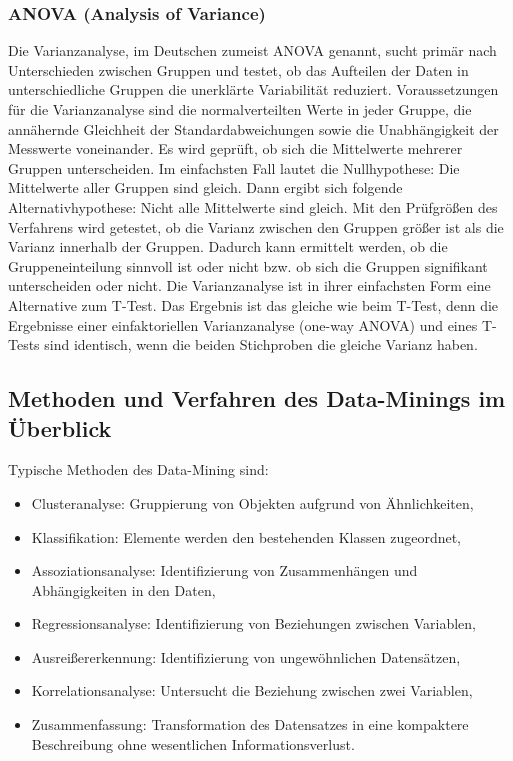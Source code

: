 \subsubsection{ANOVA (Analysis of Variance)}

\glqq Die Varianzanalyse, im Deutschen zumeist ANOVA genannt, sucht primär nach Unterschieden zwischen Gruppen und testet, ob das Aufteilen der Daten in unterschiedliche Gruppen die unerklärte Variabilität reduziert.\grqq \cite{Dormann:2013} Voraussetzungen für die Varianzanalyse sind die normalverteilten Werte in jeder Gruppe, die annähernde Gleichheit der Standardabweichungen sowie die Unabhängigkeit der Messwerte voneinander. Es wird geprüft, ob sich die Mittelwerte mehrerer Gruppen unterscheiden. Im einfachsten Fall lautet die Nullhypothese: Die Mittelwerte aller Gruppen sind gleich. Dann ergibt sich folgende Alternativhypothese: Nicht alle Mittelwerte sind gleich. Mit den Prüfgrößen des Verfahrens wird getestet, ob die Varianz zwischen den Gruppen größer ist als die Varianz innerhalb der Gruppen. Dadurch kann ermittelt werden, ob die Gruppeneinteilung sinnvoll ist oder nicht bzw. ob sich die Gruppen signifikant unterscheiden oder nicht. Die Varianzanalyse ist in ihrer einfachsten Form eine Alternative zum T-Test. Das Ergebnis ist das gleiche wie beim T-Test, \glqq denn die Ergebnisse einer einfaktoriellen Varianzanalyse (one-way ANOVA) und eines T-Tests sind identisch, wenn die beiden Stichproben die gleiche Varianz haben.\grqq \cite{Dormann:2013}

\subsection{Methoden und Verfahren des Data-Minings im Überblick}


Typische Methoden des Data-Mining sind:

\begin{itemize}
  \item Clusteranalyse: Gruppierung von Objekten aufgrund von Ähnlichkeiten,
  \item Klassifikation: Elemente werden den bestehenden Klassen zugeordnet,
  \item Assoziationsanalyse: Identifizierung von Zusammenhängen und Abhängigkeiten in den Daten,
  \item Regressionsanalyse: Identifizierung von Beziehungen zwischen Variablen,
  \item Ausreißererkennung: Identifizierung von ungewöhnlichen Datensätzen,
  \item Korrelationsanalyse: Untersucht die Beziehung zwischen zwei Variablen,
  \item Zusammenfassung: Transformation des Datensatzes in eine kompaktere Beschreibung ohne wesentlichen Informationsverlust.
\end{itemize}

